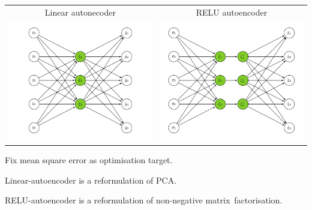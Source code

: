 \documentclass[landscape,footrule]{foils}
\begin{document}
\begin{tabular}{cc}
Linear autonecoder & RELU autoencoder\\

\includegraphics[scale=0.8]{linear-autoencoder}
&\includegraphics[scale=0.8]{relu-autoencoder}\\
\end{tabular}

Fix mean square error as optimisation target. %
\begin{triangles}
\item Linear-autoencoder is a reformulation of PCA.  
\item RELU-autoencoder is a reformulation of non-negative matrix~factorisation.
\end{triangles}
\end{document}
